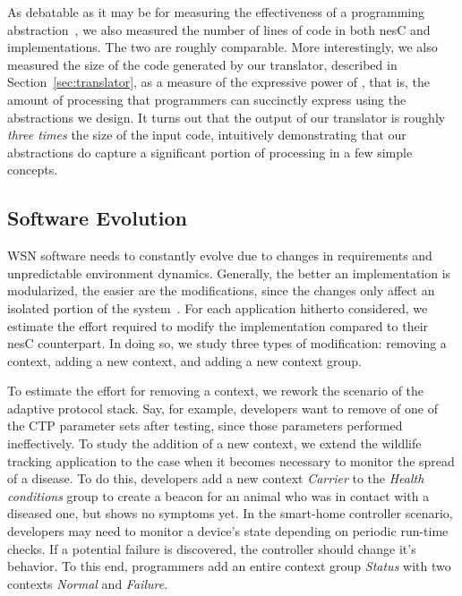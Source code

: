 

As debatable as it may be for measuring the effectiveness of a
programming abstraction~\cite{mottolasurvey}, we also measured the
number of lines of code in both nesC and \conesc implementations. The
two are roughly comparable. More interestingly, we also measured the
size of the code generated by our translator, described in
Section~\ref{sec:translator}, as a measure of the expressive power of
\conesc, that is, the amount of processing that \conesc programmers
can succinctly express using the abstractions we design. It turns out
that the output of our translator is roughly \emph{three times} the
size of the input code, intuitively demonstrating that our
abstractions do capture a significant portion of processing in a few
simple concepts.

\subsection{Software Evolution}\label{sec:evolve}

WSN software needs to constantly evolve due to changes in requirements
and unpredictable environment dynamics. Generally, the better an
implementation is modularized, the easier are the modifications, since
the changes only affect an isolated portion of the
system~\cite{embeddedSoftwareBook}. For each application hitherto
considered, we estimate the effort required to modify the \conesc
implementation compared to their nesC counterpart. In doing so, we
study three types of modification: removing a context, adding a new
context, and adding a new context group.

To estimate the effort for removing a context, we rework the scenario
of the adaptive protocol stack. Say, for example, developers want to
remove of one of the CTP parameter sets after testing, since those
parameters performed ineffectively. To study the addition of a new
context, we extend the wildlife tracking application to the case when
it becomes necessary to monitor the spread of a disease. To do this,
developers add a new context \emph{Carrier} to the \emph{Health
  conditions} group to create a beacon for an animal who was in
contact with a diseased one, but shows no symptoms yet. In the
smart-home controller scenario, developers may need to monitor a
device's state depending on periodic run-time checks. If a potential
failure is discovered, the controller should change it's behavior. To
this end, programmers add an entire context group \emph{Status} with
two contexts \emph{Normal} and \emph{Failure}.

